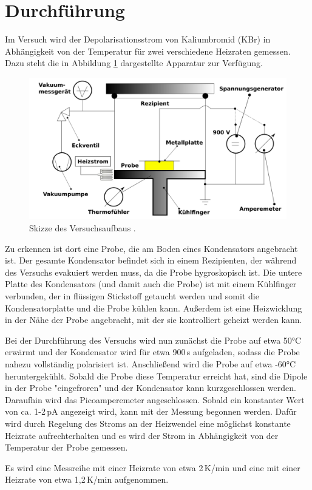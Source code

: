 \section{Durchführung}
\label{sec:Durchführung}

Im Versuch wird der Depolarisationsstrom von Kaliumbromid (KBr) in Abhängigkeit
von der Temperatur für zwei verschiedene Heizraten gemessen. Dazu steht die in
Abbildung \ref{fig:aufbau} dargestellte Apparatur zur Verfügung.

\begin{figure}
  \centering
  \includegraphics[width=\textwidth]{data/aufbau.png}
  \caption{Skizze des Versuchsaufbaus \cite{Versuchsanleitung}.}
  \label{fig:aufbau}
\end{figure}

Zu erkennen ist dort eine Probe, die am Boden eines Kondensators angebracht ist.
Der gesamte Kondensator befindet sich in einem Rezipienten, der während des
Versuchs evakuiert werden muss, da die Probe hygroskopisch ist. Die untere Platte
des Kondensators (und damit auch die Probe) ist mit einem Kühlfinger verbunden,
der in flüssigen Stickstoff getaucht werden und somit die Kondensatorplatte
und die Probe kühlen kann. Außerdem ist eine Heizwicklung in der Nähe der
Probe angebracht, mit der sie kontrolliert geheizt werden kann.

Bei der Durchführung des Versuchs wird nun zunächst die Probe auf etwa 50°C erwärmt
und der Kondensator wird für etwa 900\,s aufgeladen, sodass die Probe nahezu vollständig
polarisiert ist. Anschließend wird die Probe auf etwa -60°C heruntergekühlt.
Sobald die Probe diese Temperatur erreicht hat, sind die Dipole in der Probe
"eingefroren" und der Kondensator kann kurzgeschlossen werden. Daraufhin wird das
Picoamperemeter angeschlossen. Sobald ein konstanter Wert von ca. 1-2\,pA angezeigt
wird, kann mit der Messung begonnen werden. Dafür wird durch Regelung des Stroms
an der Heizwendel eine möglichst konstante Heizrate aufrechterhalten und es wird
der Strom in Abhängigkeit von der Temperatur der Probe gemessen.

Es wird eine Messreihe mit einer Heizrate von etwa 2\,K/min und eine mit einer Heizrate
von etwa 1{,}2\,K/min aufgenommen.
